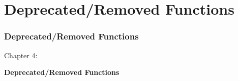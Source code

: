 %

\section{Deprecated/Removed Functions}
\begin{frame}[fragile]
	\frametitle{Deprecated/Removed Functions}

	\begin{center}\huge{Chapter 4:}\end{center}
	\begin{center}\huge{\color{typo3darkgrey}\textbf{Deprecated/Removed Functions}}\end{center}

\end{frame}


